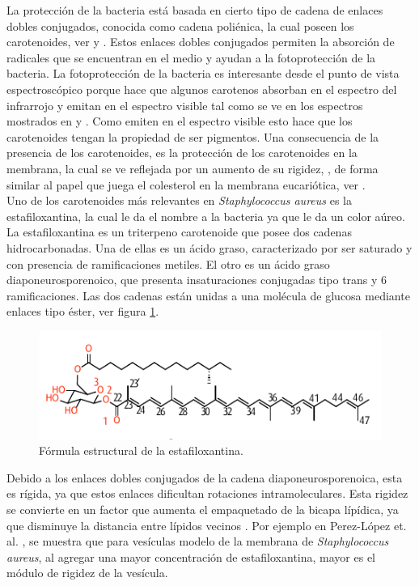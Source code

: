 La protecci\'{o}n de la bacteria est\'{a} basada en cierto tipo de cadena de enlaces dobles conjugados, conocida como cadena poli\'{e}nica, la cual poseen los carotenoides, ver \cite{Nelson2011} y \cite{Gruszecki2004CarotenoidsProperties}. Estos enlaces dobles conjugados permiten la absorci\'{o}n de radicales que se encuentran en el medio y ayudan a la fotoprotecci\'{o}n de la bacteria. La fotoprotecci\'{o}n de la bacteria es interesante desde el punto de vista espectrosc\'{o}pico porque  hace que algunos carotenos absorban en el espectro del infrarrojo y emitan en el espectro visible tal como se ve en los espectros mostrados en \cite{Gruszecki2004CarotenoidsProperties} y \cite{Wimpfheimer2015ACompounds}. Como emiten en el espectro visible esto hace que los carotenoides tengan la propiedad de ser pigmentos. Una consecuencia de la presencia de los carotenoides, es la protecci\'{o}n de los carotenoides en la membrana, la cual se ve reflejada por un aumento de su rigidez, \cite{Gruszecki2004CarotenoidsProperties}, de forma similar al papel que juega el colesterol en la membrana eucari\'{o}tica, ver \cite{Bagatolli2017VidaGrasas}.\\

Uno de los carotenoides m\'{a}s relevantes en \textit{Staphylococcus aureus} es la estafiloxantina, la cual le da el nombre a la bacteria ya que le da un color a\'{u}reo. La estafiloxantina es un  triterpeno carotenoide que posee dos cadenas hidrocarbonadas. Una de ellas es un \'{a}cido graso, caracterizado por ser saturado y con presencia de ramificaciones metiles. El otro es un \'{a}cido graso diaponeurosporenoico, que presenta insaturaciones conjugadas tipo trans y 6 ramificaciones. Las dos cadenas est\'{a}n unidas a una mol\'{e}cula de glucosa mediante enlaces tipo \'{e}ster, ver figura \ref{fig:stx}.\\

\begin{figure}[h]
\begin{center}
  \includegraphics[scale=1.4]{Kap2/stx2.pdf}
  \caption{F\'{o}rmula estructural de la estafiloxantina.}
  \label{fig:stx}
\end{center}
\end{figure}
Debido a los enlaces dobles conjugados de la cadena diaponeurosporenoica, esta es r\'{i}gida, ya que estos enlaces dificultan rotaciones intramoleculares. Esta rigidez se convierte en un factor que aumenta el empaquetado de la bicapa l\'{i}p\'{i}dica, ya que disminuye la distancia entre l\'{i}pidos vecinos \cite{Heimburg}. Por ejemplo en Perez-L\'{o}pez et. al. \cite{Perez-Lopez2019VariationsProperties}, se muestra que para ves\'{i}culas modelo de la membrana de \textit{Staphylococcus aureus}, al agregar una mayor concentraci\'{o}n de estafiloxantina, mayor es el m\'{o}dulo de rigidez de la ves\'{i}cula. \\

